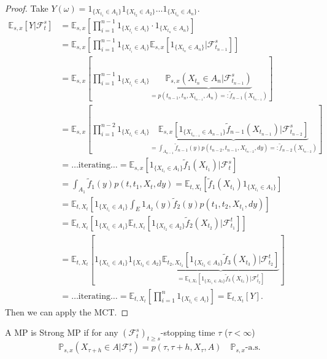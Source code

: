 \begin{proof}
    Take $Y(\omega) = 1_{\{X_{t_1} \in A_1\}} 1_{\{X_{t_2} \in A_2\}} \dots 1_{\{X_{t_n} \in A_n\}}$.
    \begin{align*}
        \mathbb{E}_{s,x}[Y | \mathcal{F}_t^s] &= \mathbb{E}_{s,x}\left[\prod_{i=1}^{n-1} 1_{\{X_{t_i} \in A_i\}} \cdot 1_{\{X_{t_n} \in A_n\}}\right] \\
        &= \mathbb{E}_{s,x}\left[\prod_{i=1}^{n-1} 1_{\{X_{t_i} \in A_i\}} \mathbb{E}_{s,x}[1_{\{X_{t_n} \in A_n\}} | \mathcal{F}_{t_{n-1}}^s]\right] \\
        &= \mathbb{E}_{s,x}\left[\prod_{i=1}^{n-1} 1_{\{X_{t_i} \in A_i\}} \underbrace{\mathbb{P}_{s,x}(X_{t_n} \in A_n | \mathcal{F}_{t_{n-1}}^s)}_{= p(t_{n-1}, t_n, X_{t_{n-1}}, A_n) =: \tilde{f}_{n-1}(X_{t_{n-1}})}\right] \\
        &= \mathbb{E}_{s,x}\left[\prod_{i=1}^{n-2} 1_{\{X_{t_i} \in A_i\}} \underbrace{\mathbb{E}_{s,x}[1_{\{X_{t_{n-1}} \in A_{n-1}\}} \tilde{f}_{n-1}(X_{t_{n-1}}) | \mathcal{F}_{t_{n-2}}^s]}_{= \int_{A_{n-1}} \tilde{f}_{n-1}(y) p(t_{n-2}, t_{n-1}, X_{t_{n-2}}, dy) =: \tilde{f}_{n-2}(X_{t_{n-2}})}\right] \\
        &= \dots \text{iterating} \dots = \mathbb{E}_{s,x}[1_{\{X_{t_1} \in A_1\}} \tilde{f}_1(X_{t_1}) | \mathcal{F}_t^s] \\
        &= \int_{A_1} \tilde{f}_1(y) p(t, t_1, X_t, dy) = \mathbb{E}_{t, X_t}[\tilde{f}_1(X_{t_1}) 1_{\{X_{t_1} \in A_1\}}] \\
        &= \mathbb{E}_{t, X_t}\left[1_{\{X_{t_1} \in A_1\}} \int_E 1_{A_2}(y) \tilde{f}_2(y) p(t_1, t_2, X_{t_1}, dy)\right] \\
        &= \mathbb{E}_{t, X_t}\left[1_{\{X_{t_1} \in A_1\}} \mathbb{E}_{t, X_t}[1_{\{X_{t_2} \in A_2\}} \tilde{f}_2(X_{t_2}) | \mathcal{F}_{t_1}^t]\right] \\
        &= \mathbb{E}_{t, X_t}\left[1_{\{X_{t_1} \in A_1\}} 1_{\{X_{t_2} \in A_2\}} \underbrace{\mathbb{E}_{t_2, X_{t_2}}[1_{\{X_{t_3} \in A_3\}} \tilde{f}_3(X_{t_3}) | \mathcal{F}_{t_2}^t]}_{= \mathbb{E}_{t, X_t}[1_{\{X_{t_3} \in A_3\}} \tilde{f}_3(X_{t_3}) | \mathcal{F}_{t_2}^t]}\right] \\
        &= \dots \text{iterating} \dots = \mathbb{E}_{t, X_t}\left[\prod_{i=1}^n 1_{\{X_{t_i} \in A_i\}}\right] = \mathbb{E}_{t, X_t}[Y].
    \end{align*}
    Then we can apply the MCT.
\end{proof}

\begin{definition}
    A MP is Strong MP if for any $(\mathcal{F}_t^s)_{t \ge s}$-stopping time $\tau$ ($\tau < \infty$)
    $$\mathbb{P}_{s,x}(X_{\tau+h} \in A | \mathcal{F}_\tau^s) = p(\tau, \tau+h, X_\tau, A) \quad \mathbb{P}_{s,x}\text{-a.s.}$$
\end{definition}

